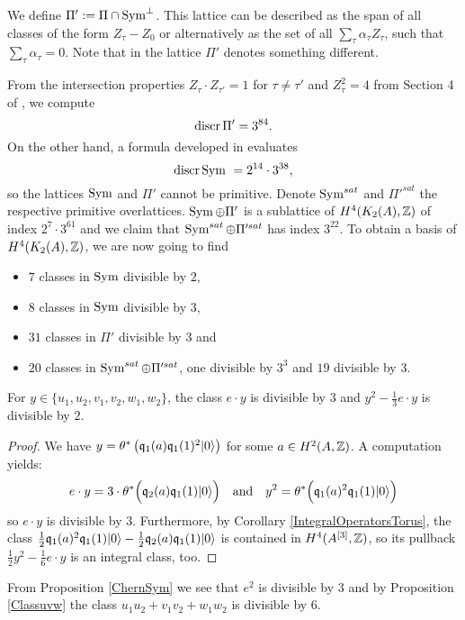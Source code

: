\begin{definition}\label{defiPi}
We define $\Pi' := \Pi \cap \operatorname{Sym}^{\perp}$. This lattice can be described as the span of all classes of the form $Z_\tau -Z_0$ or alternatively as the set of all
$
\sum_\tau \alpha_\tau Z_\tau $, such that $ \sum_\tau \alpha_\tau =0$.
Note that in \cite{Hassett} the lattice $\Pi'$ denotes something different.
\end{definition}
From the intersection properties $Z_\tau \cdot Z_{\tau'} = 1$ for $\tau\neq \tau'$ and $Z_\tau^2 = 4$ from Section 4 of \cite{Hassett}, we compute
\begin{equation}
 \operatorname{discr} \Pi' = 3^{84}.
 \label{discrPi}
\end{equation}
On the other hand, a formula developed in \cite{Kapfer} evaluates
\begin{equation} \label{DiscrSym}
\operatorname{discr} \operatorname{Sym} \ = 2^{14}\cdot 3^{38},
\end{equation}
so the lattices $\operatorname{Sym}$ and $\Pi'$ cannot be primitive. Denote $\operatorname{Sym}^{sat}$ and $\Pi'^{sat}$ the respective primitive overlattices. $\operatorname{Sym} \oplus\Pi'$ is a sublattice of $H^4(K_{ 2 }( A ),\mathbb{Z})$ of index $2^{7}\cdot 3^{61}$ and we claim that $\operatorname{Sym}^{sat}\oplus \Pi'^{sat}$ has index $3^{22}$. To obtain a basis of $H^4(K_{ 2 }( A ),\mathbb{Z})$, we are now going to find
\begin{itemize}
 \item $7$ classes in $\operatorname{Sym}$ divisible by $2$,
 \item $8$ classes in $\operatorname{Sym}$ divisible by $3$,
 \item $31$ classes in $\Pi'$ divisible by $3$ and
 \item $20$ classes in $\operatorname{Sym}^{sat}\oplus \Pi'^{sat}$, one divisible by $3^3$ and $19$ divisible by $3$.
\end{itemize}

\begin{proposition}\label{classedivisibleSym}
For $y\in\{u_1,u_2,v_1,v_2,w_1,w_2\}$, the class
$
e \cdot y
$
is divisible by $3$ and 
$
 y^2 - \frac{1}{3} e\cdot y
$
is divisible by $2$.
\end{proposition}
\begin{proof}
We have $y= \theta^*\left(\mathfrak{q}_1(a)\mathfrak{q}_1(1)^2|0\rangle\right)$ for some $a\in H^2(A,\mathbb{Z})$. A computation yields:
$$
e\cdot y = 3\cdot \theta^*\Big( \mathfrak{q}_2(a)\mathfrak{q}_1(1)|0\rangle \Big)
\quad \text{and}\quad
y^2 = \theta^*\Big(\mathfrak{q}_1(a)^2\mathfrak{q}_1(1)|0\rangle\Big)
$$
so $e\cdot y$ is divisible by $3$. Furthermore, by Corollary \ref{IntegralOperatorsTorus}, the class 
$
\frac{1}{2} \mathfrak{q}_1(a)^2\mathfrak{q}_1(1)|0\rangle - \frac{1}{2} \mathfrak{q}_2(a)\mathfrak{q}_1(1)|0\rangle 
$
is contained in $H^4(A^{[3]},\mathbb{Z})$, so its pullback
$
 \frac{1}{2}y^2 - \frac{1}{6} e\cdot y
$
is an integral class, too.
\end{proof}
From Proposition \ref{ChernSym} we see that
$e^2$ is divisible by $3$ and by Proposition \ref{Classuvw}
the class $u_1u_2 + v_1v_2+w_1w_2$ is divisible by 6.

